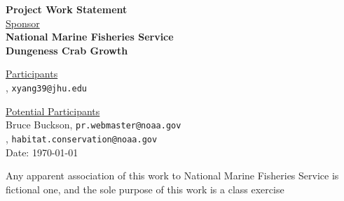 \documentclass[12pt,letterpaper]{article}
\theoremstyle{definition}
\begin{document}
\def\shiftdowna{0.32in}  %
\def\shiftdownb{0.22in}  %


\begin{center}
\textbf{{\large Project Work Statement}}\\


\vspace \shiftdowna
\underline {Sponsor}\\ 
\vspace{5pt}
\textbf{{\large National Marine Fisheries Service}}\\


\vspace \shiftdowna
\textbf{{\large Dungeness Crab Growth}}


\vspace{0.35in}
\vspace \shiftdownb
\underline {Participants} \\
\vspace{5pt}
, \texttt{xyang39@jhu.edu}

\vspace \shiftdownb
\underline {Potential Participants}\\
\vspace{5pt}
Bruce Buckson, \texttt{pr.webmaster@noaa.gov} \\
\vspace{3pt}
, \texttt{habitat.conservation@noaa.gov} \\

\vspace \shiftdowna
Date: \today

\end{center}

\vfill  
\footnoterule
\noindent \small{Any apparent association of this work to National Marine Fisheries Service is
fictional one, and the sole purpose of this work is a class exercise}

\newpage
\end{document}
